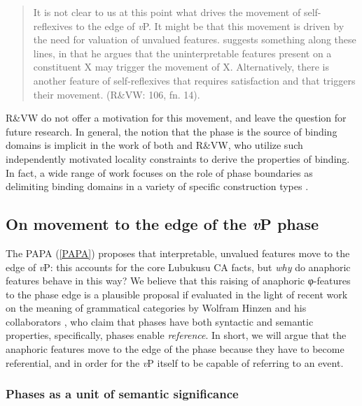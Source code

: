 \documentclass[output=paper
,modfonts
,nonflat
]{langsci/langscibook}
\begin{document}
\begin{quote}
It is not clear to us at this point what drives the movement of self-reflexives to the edge of \textit{v}P. It might be that this movement is driven by the need for valuation of unvalued features. \citet{Boskovic:2007a} suggests something along these lines, in that he argues that the uninterpretable features present on a constituent X may trigger the movement of X. Alternatively, there is another feature of self-reflexives that requires satisfaction and that triggers their movement. (R\&VW: 106, fn. 14).
\end{quote}
\noindent R\&VW do not offer a motivation for this movement, and leave the question for future research. In general, the notion that the phase is the source of binding domains is implicit in the work of both \citet{Reuland:2011} and R\&VW, who utilize such independently motivated locality constraints to derive the properties of binding. In fact, a wide range of work focuses on the role of phase boundaries as delimiting binding domains in a variety of specific construction types \citep{Wurmbrand:2011,Lee-Schoenfeld:2008,Canac-Marquis:2005,Heinat:2006,Hicks:2009,Quicoli:2008,CharnavelSportiche:2016}.

\subsection{On movement to the edge of the \textit{v}P phase}

The PAPA (\ref{PAPA}) proposes that interpretable, unvalued features move to the edge of \textit{v}P: this accounts for the core Lubukusu CA facts, but \textit{why} do anaphoric features behave in this way? We believe that this raising of anaphoric φ-features to the phase edge is a plausible proposal if evaluated in the light of recent work on the meaning of grammatical categories by Wolfram Hinzen and his collaborators \citep{Hinzen:2012,SheehanHinzen:2011,HinzenSheehan:2013,ArsenijevicHinzen:2012}, who claim that phases have both syntactic and semantic properties, specifically, phases enable \textit{reference}. In short, we will argue that the anaphoric features move to the edge of the phase because they have to become referential, and in order for the \textit{v}P itself to be capable of referring to an event. 

\subsubsection{Phases as a unit of semantic significance}
\end{document}
